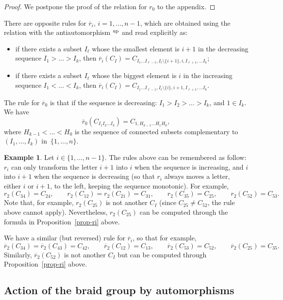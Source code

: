 \documentclass[pdftex]{sigma}
\numberwithin{equation}{section}
\theoremstyle{definition}
\newtheorem{exam}[theo]{Example}
\newcommand{\rb}{\overline{r}}
\begin{document}
\begin{proof}
We postpone the proof of the relation for $r_0$ to the appendix.
\end{proof}

There are opposite rules for $\rb_i$, $i=1,\dots,n-1$, which are obtained using the relation with the antiautomorphism ${}^{\rm up}$ and read explicitly as:
\begin{itemize}\itemsep=0pt
\item if there exists a subset $I_\ell$ whose the smallest element is $i+1$ in the decreasing sequence $I_1>\dots>I_k$, then
$\rb_i(C_I)= C_{I_1\dots I_{\ell-1}, I_{\ell}\setminus \{i+1\},i, I_{\ell+1},\dots I_k}$;

\item if there exists a subset $I_\ell$ whose the biggest element is $i$ in the increasing sequence $I_1<\dots<I_k$, then
$\rb_i(C_I)= C_{I_1\dots I_{\ell-1}, I_{\ell}\setminus \{i\},i+1, I_{\ell+1},\dots I_k}$.
\end{itemize}
The rule for $\rb_0$ is that if the sequence is decreasing: $I_1 > I_2 >\dots> I_k$, and $1\in I_k$. We have
\begin{equation*}
 \rb_0( C_{I_1I_2\dots I_k} ) = C_{1, H_{k-1} \dots H_{1}H_0},
\end{equation*}
where $H_{k-1}<\dots < H_0$ is the sequence of connected subsets complementary to $(I_1,\dots,I_k)$ in~$\{1,\dots,n\}$.


\begin{exam}
Let $i\in\{1,\dots,n-1\}$. The rules above can be remembered as follow: $r_i$ can only transform the letter $i+1$ into $i$ when the sequence is increasing, and $i$ into $i+1$ when the sequence is decreasing (so that $r_i$ always moves a letter, either $i$ or $i+1$, to the left, keeping the sequence monotonic). For example,
\[
r_2(C_{34})=C_{24} ,\qquad r_2(C_{12})=r_2(C_{21})=C_{31} ,\qquad r_2(C_{35})=C_{25} ,\qquad r_2(C_{52})=C_{53} .
\]
Note that, for example, $r_2(C_{25})$ is not another $C_I$ (since $C_{25}\neq C_{52}$, the rule above cannot apply). Nevertheless, $r_2(C_{25})$ can be computed through the formula in Proposition~\ref{prop-ri} above.

We have a similar (but reversed) rule for $\rb_i$, so that for example,
\[
\rb_2(C_{34})=\rb_2(C_{43})=C_{42} ,\qquad \rb_2(C_{12})=C_{13} ,\qquad \rb_2(C_{53})=C_{52} ,\qquad \rb_2(C_{25})=C_{35} .
\]
Similarly, $\rb_2(C_{52})$ is not another $C_I$ but can be computed through Proposition~\ref{prop-ri} above.
\end{exam}


\subsection{Action of the braid group by automorphisms}
\end{document}
